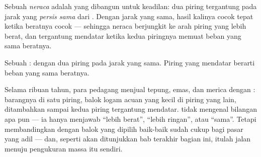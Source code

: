 \begin{definition}[Neraca]\label{def:g3:levers-and-scales:scale}
Sebuah \emph{neraca} adalah  yang dibangun untuk
keadilan: dua piring tergantung pada jarak yang \emph{persis sama}
dari . Dengan jarak yang sama, hasil kalinya cocok tepat
ketika beratnya cocok --- sehingga neraca berjungkit ke arah piring
yang lebih berat, dan tergantung mendatar ketika kedua piringnya
memuat beban yang sama beratnya.
\end{definition}

\begin{omfigure}

{\small Sebuah :  dengan dua piring pada jarak yang sama.
Piring yang mendatar berarti beban yang sama beratnya.}
\end{omfigure}

\begin{example}\label{ex:g3:levers-and-scales:weighing}
Selama ribuan tahun, para pedagang menjual tepung, emas, dan merica
dengan : barangnya di satu piring, balok logam acuan yang kecil
di piring yang lain, ditambahkan sampai kedua piring tergantung
mendatar.  tidak mengenal bilangan apa pun --- ia hanya menjawab
``lebih berat'', ``lebih ringan'', atau ``sama''. Tetapi membandingkan
dengan balok yang dipilih baik-baik sudah cukup bagi pasar yang adil
--- dan, seperti akan ditunjukkan bab terakhir bagian ini, itulah
jalan menuju pengukuran massa itu sendiri.
\end{example}

